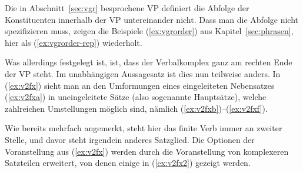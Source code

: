 Die in Abschnitt~\ref{sec:vgr} besprochene VP definiert die Abfolge der Konstituenten innerhalb der VP untereinander nicht.
Dass man die Abfolge nicht spezifizieren muss, zeigen die Beispiele (\ref{ex:vgrorder}) aus Kapitel~\ref{sec:phrasen}, hier als (\ref{ex:vgrorder-rep}) wiederholt.

\begin{exe}
  \ex\label{ex:vgrorder-rep}
  \begin{xlist}
  \end{xlist}
\end{exe}

Was allerdings festgelegt ist, ist, dass der Verbalkomplex ganz am rechten Ende der VP steht.
Im unabhängigen Aussagesatz ist dies nun teilweise anders.
In (\ref{ex:v2fx}) sieht man an den Umformungen eines eingeleiteten Nebensatzes (\ref{ex:v2fxa}) in uneingeleitete Sätze (also sogenannte Hauptsätze), welche zahlreichen Umstellungen möglich sind, nämlich \zB (\ref{ex:v2fxb})--(\ref{ex:v2fxf}).

\begin{exe}
  \ex\label{ex:v2fx}
  \begin{xlist}
  \end{xlist}
\end{exe}

Wie bereits mehrfach angemerkt, steht hier das finite Verb immer an zweiter Stelle, und davor steht irgendein anderes Satzglied.
Die Optionen der Voranstellung aus (\ref{ex:v2fx}) werden durch die Voranstellung von komplexeren Satzteilen erweitert, von denen einige in (\ref{ex:v2fx2}) gezeigt werden.

\begin{exe}
  \ex\label{ex:v2fx2}
  \begin{xlist}
  \end{xlist}
\end{exe}

